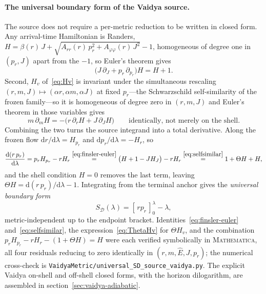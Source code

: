 \documentclass[12pt]{iopart}
\newcommand{\Ehat}{\hat E}
\newcommand{\dd}{\mathrm{d}}
\theoremstyle{plain}
\theoremstyle{definition}
\theoremstyle{plain}
\theoremstyle{remark}
\begin{document}
\paragraph{The universal boundary form of the Vaidya source.} The source does not
require a per-metric reduction to be written in closed form. Any arrival-time
Hamiltonian is Randers, $H=\beta(r)\,J+\sqrt{A_{rr}(r)\,p_r^2+A_{\varphi\varphi}(r)\,J^2}-1$,
homogeneous of degree one in $(p_r,J)$ apart from the $-1$, so Euler's theorem gives
\begin{equation}
    \big(J\,\partial_J+p_r\,\partial_{p_r}\big)H=H+1 .
    \label{eq:finsler-euler}
\end{equation}
Second, $H_v$ of~\eqref{eq:Hv} is invariant under the simultaneous rescaling
$(r,m,J)\mapsto(\alpha r,\alpha m,\alpha J)$ at fixed $p_r$---the Schwarzschild
self-similarity of the frozen family---so it is homogeneous of degree zero in $(r,m,J)$ and
Euler's theorem in those variables gives
\begin{equation}
    m\,\partial_m H=-\big(r\,\partial_r H+J\,\partial_J H\big)
    \qquad\text{identically, not merely on the shell.}
    \label{eq:selfsimilar}
\end{equation}
Combining the two turns the source integrand into a total derivative. Along the frozen
flow $\dd r/\dd\lambda=H_{p_r}$ and $\dd p_r/\dd\lambda=-H_r$, so
\[
   \frac{\dd (r\,p_r)}{\dd\lambda}=p_r H_{p_r}-r H_r
   \overset{\eqref{eq:finsler-euler}}{=}\big(H+1-J H_J\big)-r H_r
   \overset{\eqref{eq:selfsimilar}}{=}1+\Theta H+H ,
\]
and the shell condition $H=0$ removes the last term, leaving
$\Theta H=\dd(r\,p_r)/\dd\lambda-1$. Integrating from the terminal anchor gives the
\emph{universal boundary form}
\begin{equation}
    S_{\mathcal D}(\lambda)=[\,rp_r\,]_0^{\lambda}-\lambda,
    \label{eq:SD-vaidya}
\end{equation}
metric-independent up to the endpoint bracket. Identities~\eqref{eq:finsler-euler}
and~\eqref{eq:selfsimilar}, the expression~\eqref{eq:ThetaHv} for $\Theta H_v$, and the
combination $p_rH_{p_r}-rH_r-(1+\Theta H)=H$ were each verified symbolically in
\textsc{Mathematica}, all four residuals reducing to zero identically in
$(r,m,\Ehat,J,p_r)$; the numerical cross-check is
\texttt{VaidyaMetric/universal\_SD\_source\_vaidya.py}. The explicit Vaidya on-shell and
off-shell closed forms, with the horizon dilogarithm, are assembled in
section~\ref{sec:vaidya-adiabatic}.
\end{document}
